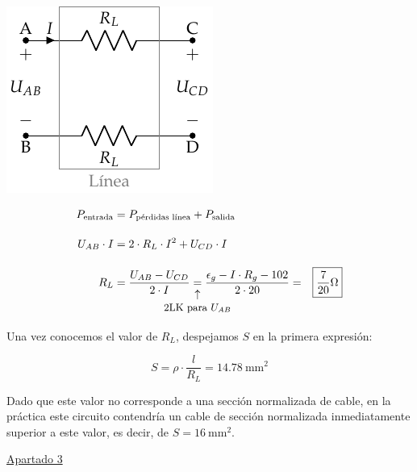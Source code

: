 \begin{example}
\begin{itemize}
    \vspace{2mm}
    \begin{minipage}{0.4\linewidth}
      \begin{center}
        \includegraphics[scale=1]{../figs/linea_lkv.pdf}
      \end{center}
    \end{minipage}
    \begin{minipage}{0.6\linewidth}
      \begin{align*}
        P_{\textrm{entrada}} &= P_{\textrm{pérdidas línea}} + P_{\textrm{salida}}\\[10pt]
        U_{AB} \cdot I &= 2 \cdot R_L \cdot I^2 + U_{CD} \cdot I\\[10pt] 
        R_L &= \frac{U_{AB}-U_{CD}}{2 \cdot I} \underarrow[=][\uparrow]{\small 2LK para \ensuremath{U_{AB}} } \frac{\epsilon_g - I\cdot R_g - 102}{2 \cdot 20} = \Aboxed{ {\frac{7}{20}}\si{\ohm} }
      \end{align*}
    \end{minipage}
  \end{itemize}

  Una vez conocemos el valor de $R_L$, despejamos $S$ en la primera
  expresión:

\[
  S = \rho \cdot \frac{l}{R_L} = \boxed{
    \qty{14.78}{\milli\meter\squared} }
\]

Dado que este valor no corresponde a una sección normalizada de cable,
en la práctica este circuito contendría un cable de sección
normalizada inmediatamente superior a este valor, es decir, de
$S = \qty{16}{\milli\meter\squared}$.

\vspace{6mm}

\underline{Apartado 3}


\end{example}
